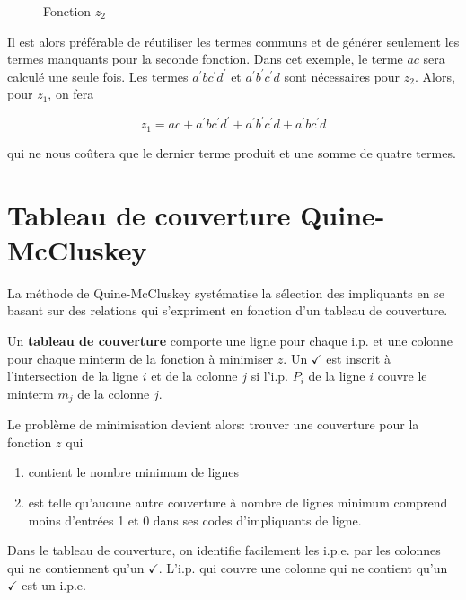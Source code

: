 \documentclass[letter, oneside]{book}
\begin{document}
\begin{enumerate}
\begin{figure}[htbp]
\centering

\caption{\label{fig:orga8ac1f3}Fonction \(z_2\)}
\end{figure}

Il est alors préférable de réutiliser les termes communs et de générer
seulement les termes manquants pour la seconde fonction. Dans cet
exemple, le terme \(a c\) sera calculé une seule fois. Les termes
\(a^{\prime} b c^{\prime} d^{\prime}\) et \(a^{\prime} b^{\prime}
c^{\prime} d\) sont nécessaires pour \(z_2\). Alors, pour \(z_1\), on
fera

$$ z_1 =  a c + a^{\prime}  b c^{\prime} d^{\prime} +
a^{\prime} b^{\prime} c^{\prime} d +
a^{\prime} b c^{\prime} d $$

qui ne nous coûtera que le dernier terme produit et une somme de
quatre termes.
\end{enumerate}


\section{Tableau de couverture Quine-McCluskey}
\label{sec:orgf82b64e}

La méthode de Quine-McCluskey systématise la sélection des impliquants
en se basant sur des relations qui s'expriment en fonction d'un
tableau de couverture.

Un \textbf{tableau de couverture} comporte une ligne pour chaque i.p. et une
colonne pour chaque minterm de la fonction à minimiser \(z\). Un \(\checkmark\) est
inscrit à l'intersection de la ligne \(i\) et de la colonne  \(j\) si
l'i.p.  \(P_i\) de la ligne  \(i\) couvre le minterm  \(m_j\) de la colonne
 \(j\).

Le problème de minimisation devient alors: trouver une couverture pour
la fonction \(z\) qui

\begin{enumerate}
\item contient le nombre minimum de lignes

\item est telle qu'aucune autre couverture à nombre de lignes minimum
comprend moins d'entrées 1 et 0 dans ses codes d'impliquants de
ligne.
\end{enumerate}

Dans le tableau de couverture, on identifie facilement les i.p.e. par
les colonnes qui ne contiennent qu'un \(\checkmark\). L'i.p. qui couvre une colonne
qui ne contient qu'un \(\checkmark\) est un i.p.e.
\end{document}

